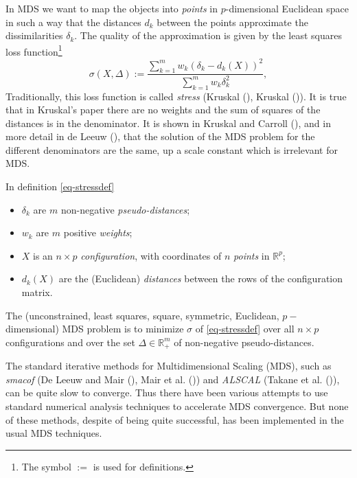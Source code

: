 \documentclass[
  12pt,
  letterpaper,
  DIV=11,
  numbers=noendperiod]{scrartcl}
\newcounter{none} %
\providecommand{\tightlist}{%
  \setlength{\itemsep}{0pt}\setlength{\parskip}{0pt}}
\begin{document}
In MDS we want to map the objects into \emph{points} in
\(p\)-dimensional Euclidean space in such a way that the distances
\(d_k\) between the points approximate the dissimilarities \(\delta_k\).
The quality of the approximation is given by the least squares loss
function\footnote{The symbol $:=$ is used for definitions.}
\begin{equation}
  \sigma(X,\Delta) := \frac{\sum_{k=1}^mw_k(\delta_k - d_k(X))^2}{\sum_{k=1}^mw_k\delta_k^2}, \label{eq-stressdef}
\end{equation} Traditionally, this loss function is called \emph{stress}
(Kruskal (), Kruskal
()). It is true that in Kruskal's paper
there are no weights and the sum of squares of the distances is in the
denominator. It is shown in Kruskal and Carroll
(), and in more detail in {de
Leeuw} (), that the solution of the
MDS problem for the different denominators are the same, up a scale
constant which is irrelevant for MDS.

In definition \eqref{eq-stressdef}

\begin{itemize}
\tightlist
\item
  \(\delta_k\) are \(m\) non-negative \emph{pseudo-distances};
\item
  \(w_k\) are \(m\) positive \emph{weights};
\item
  \(X\) is an \(n \times p\) \emph{configuration}, with coordinates of
  \(n\) \emph{points} in \(\mathbb{R}^p\);
\item
  \(d_k(X)\) are the (Euclidean) \emph{distances} between the rows of
  the configuration matrix.
\end{itemize}

The (unconstrained, least squares, square, symmetric, Euclidean,
\(p -\)dimensional) MDS problem is to minimize \(\sigma\) of
\eqref{eq-stressdef} over all \(n \times p\) configurations and over the
set \(\Delta \in \mathbb{R}^m_+\) of non-negative pseudo-distances.

The standard iterative methods for Multidimensional Scaling (MDS), such
as \emph{smacof} (De Leeuw and Mair
(), {Mair et al.}
()) and \emph{ALSCAL}
({Takane et al.} ()), can
be quite slow to converge. Thus there have been various attempts to use
standard numerical analysis techniques to accelerate MDS convergence.
But none of these methods, despite of being quite successful, has been
implemented in the usual MDS techniques.
\end{document}
